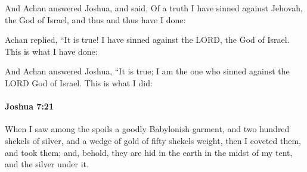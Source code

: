			\begin{versebox}
					\item[BHS] 
					\item[ASV] And Achan answered Joshua, and said, Of a truth I have sinned against Jehovah, the God of Israel, and thus and thus have I done:
					\item[NIV] Achan replied, “It is true! I have sinned against the LORD, the God of Israel. This is what I have done:
					\item[NRSV] And Achan answered Joshua, “It is true; I am the one who sinned against the LORD God of Israel. This is what I did:
			\end{versebox}

		\paragraph{Joshua 7:21} %
			\label{JOSHUA-7-21}

			When I saw among the spoils a goodly Babylonish garment, and two hundred shekels of silver, and a wedge of gold of fifty shekels weight, then I coveted them, and took them; and, behold, they are hid in the earth in the midst of my tent, and the silver under it.

